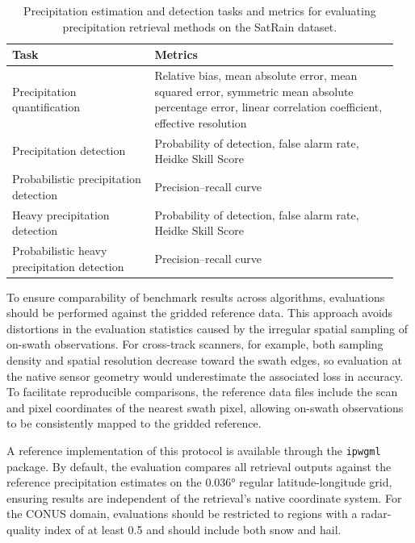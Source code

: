 \documentclass[11pt]{article}
\begin{document}
\begin{table}[htbp]
	\centering
	\caption{Precipitation estimation and detection tasks and metrics for evaluating
		precipitation retrieval methods on the SatRain dataset.}
	\begin{tabular}{>{\raggedright\arraybackslash}p{0.35\linewidth}
		>{\raggedright\arraybackslash}p{0.6\linewidth}} \toprule
		\textbf{Task}                               & \textbf{Metrics}                                   \\ \midrule Precipitation quantification &
		Relative bias, mean absolute error, mean squared error, symmetric mean
		absolute percentage error, linear correlation coefficient, effective
		resolution                                                                                       \\
		\addlinespace
		Precipitation detection                     & Probability of detection, false alarm rate, Heidke
		Skill Score                                                                                      \\
		\addlinespace
		Probabilistic precipitation detection       & Precision--recall curve                            \\
		\addlinespace
		Heavy precipitation detection               & Probability of detection, false alarm rate,
		Heidke Skill Score                                                                               \\
		\addlinespace
		Probabilistic heavy precipitation detection & Precision--recall curve
		\\ \bottomrule
	\end{tabular}
\end{table}

To ensure comparability of benchmark results across algorithms, evaluations
should be performed against the gridded reference data. This approach avoids
distortions in the evaluation statistics caused by the irregular spatial
sampling of on-swath observations. For cross-track scanners, for example, both
sampling density and spatial resolution decrease toward the swath edges, so
evaluation at the native sensor geometry would underestimate the associated loss
in accuracy. To facilitate reproducible comparisons, the reference data files
include the scan and pixel coordinates of the nearest swath pixel, allowing
on-swath observations to be consistently mapped to the gridded reference.

A reference implementation of this protocol is available through the
\texttt{ipwgml} package. By default, the evaluation compares all retrieval
outputs against the reference precipitation estimates on the 0.036° regular
latitude-longitude grid, ensuring results are independent of the retrieval’s
native coordinate system. For the CONUS domain, evaluations should be restricted
to regions with a radar-quality index of at least 0.5 and should include both
snow and hail.
\end{document}
